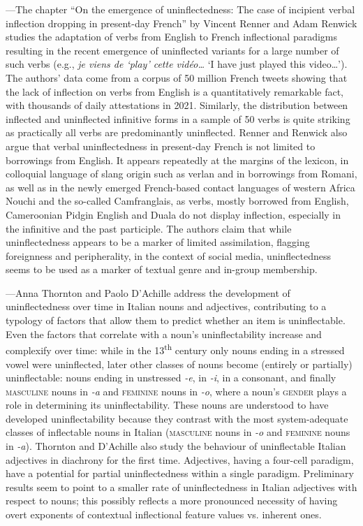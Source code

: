 \documentclass[output=paper]{langscibook}
\begin{document}
---The chapter ``On the emergence of uninflectedness: The case of incipient verbal inflection dropping in present-day French'' by Vincent Renner and Adam Renwick studies the adaptation of verbs from English to French inflectional para\-digms resulting in the recent emergence of uninflected variants for a large number of such verbs (e.g., \emph{je viens de `play' cette vidéo\ldots{}} `I have just played this video\ldots'). The authors' data come from a corpus of 50 million French tweets showing that the lack of inflection on verbs from English is a quantitatively remarkable fact, with thousands of daily attestations in 2021. Similarly, the distribution between inflected and uninflected infinitive forms in a sample of 50 verbs is quite striking as practically all verbs are predominantly uninflected. Renner and Renwick also argue that verbal uninflectedness in present-day French is not limited to borrowings from English. It appears repeatedly at the margins of the lexicon, in colloquial language of slang origin such as verlan and in borrowings from Romani, as well as in the newly emerged French-based contact languages of western Africa Nouchi and the so-called Camfranglais, as verbs, mostly borrowed from English, Cameroonian Pidgin English and Duala do not display inflection, especially in the infinitive and the past participle. The authors claim that while uninflectedness appears to be a marker of limited assimilation, flagging foreignness and peripherality, in the context of social media, uninflectedness seems to be used as a marker of textual genre and in-group membership.

---Anna Thornton and Paolo D'Achille address the development of uninflectedness over time in Italian nouns and adjectives, contributing to a typology of factors that allow them to predict whether an item is uninflectable. Even the factors that correlate with a noun's uninflectability increase and complexify over time: while in the 13\textsuperscript{th} century only nouns ending in a stressed vowel were uninflected, later other classes of nouns become (entirely or partially) uninflectable: nouns ending in unstressed \emph{-e}, in \emph{-i}, in a consonant, and finally \textsc{masculine} nouns in \emph{-a} and \textsc{feminine} nouns in \emph{-o}, where a noun's \textsc{gender} plays a role in determining its uninflectability. These nouns are understood to have developed uninflectability because they contrast with the most system-adequate classes of inflectable nouns in Italian (\textsc{masculine} nouns in \emph{-o} and \textsc{feminine} nouns in \emph{-a}). Thornton and D'Achille also study the behaviour of uninflectable Italian adjectives in diachrony for the first time. Adjectives, having a four-cell paradigm, have a potential for partial uninflectedness within a single paradigm. Preliminary results seem to point to a smaller rate of uninflectedness in Italian adjectives with respect to nouns; this possibly reflects a more pronounced necessity of having overt exponents of contextual inflectional feature values vs. inherent ones.
\end{document}
